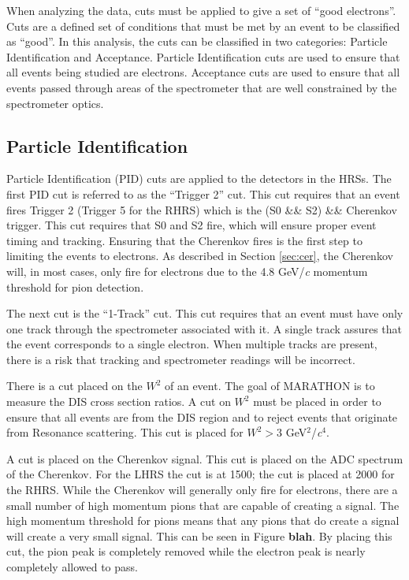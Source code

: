 When analyzing the data, cuts must be applied to give a set of ``good electrons''. Cuts are a defined set of conditions that must be met by an event to be classified as ``good''. In this analysis, the cuts can be classified in two categories: Particle Identification and Acceptance. Particle Identification cuts are used to ensure that all events being studied are electrons. Acceptance cuts are used to ensure that all events passed through areas of the spectrometer that are well constrained by the spectrometer optics.

\subsection{Particle Identification}

Particle Identification (PID) cuts are applied to the detectors in the HRSs. The first PID cut is referred to as the ``Trigger 2'' cut. This cut requires that an event fires Trigger 2 (Trigger 5 for the RHRS) which is the (S0 \&\& S2) \&\& Cherenkov trigger. This cut requires that S0 and S2 fire, which will ensure proper event timing and tracking. Ensuring that the Cherenkov fires is the first step to limiting the events to electrons. As described in Section \ref{sec:cer}, the Cherenkov will, in most cases, only fire for electrons due to the 4.8 GeV/\textit{c} momentum threshold for pion detection.

The next cut is the ``1-Track'' cut. This cut requires that an event must have only one track through the spectrometer associated with it. A single track assures that the event corresponds to a single electron. When multiple tracks are present, there is a risk that tracking and spectrometer readings will be incorrect.

There is a cut placed on the $W^2$ of an event. The goal of MARATHON is to measure the DIS cross section ratios. A cut on $W^2$ must be placed in order to ensure that all events are from the DIS region and to reject events that originate from Resonance scattering. This cut is placed for $W^2>3$  GeV$^2$/\textit{c}$^4$.

A cut is placed on the Cherenkov signal. This cut is placed on the ADC spectrum of the Cherenkov. For the LHRS the cut is at 1500; the cut is placed at 2000 for the RHRS. While the Cherenkov will generally only fire for electrons, there are a small number of high momentum pions that are capable of creating a signal. The high momentum threshold for pions means that any pions that do create a signal will create a very small signal. This can be seen in Figure \textbf{blah}. By placing this cut, the pion peak is completely removed while the electron peak is nearly completely allowed to pass.

